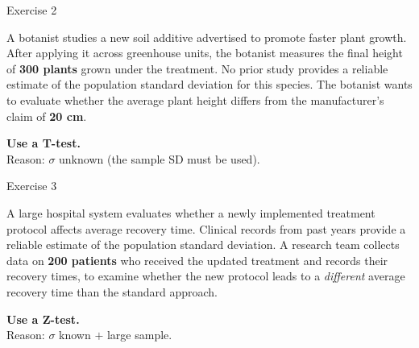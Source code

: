 \documentclass[aspectratio=169,11pt]{beamer}
\begin{document}
\begin{frame}{Exercise 2}
  \begin{keybox}[Scenario]
    A botanist studies a new soil additive advertised to promote faster plant
    growth. After applying it across greenhouse units, the botanist measures the
    final height of \textbf{300 plants} grown under the treatment. No prior study
    provides a reliable estimate of the population standard deviation for this
    species. The botanist wants to evaluate whether the average plant height
    differs from the manufacturer's claim of \textbf{20 cm}.
  \end{keybox}
  \vspace{0.5em}
  \begin{tcolorbox}[colback=qrlight,colframe=qrblue,arc=2pt,boxrule=0.6pt]
    \textbf{\color{qrnavy}Use a T-test.}\\
    Reason: $\sigma$ unknown (the sample SD must be used).
  \end{tcolorbox}
\end{frame}

\begin{frame}{Exercise 3}
  \begin{keybox}[Scenario]
    A large hospital system evaluates whether a newly implemented treatment
    protocol affects average recovery time. Clinical records from past years
    provide a reliable estimate of the population standard deviation. A research
    team collects data on \textbf{200 patients} who received the updated
    treatment and records their recovery times, to examine whether the new
    protocol leads to a \emph{different} average recovery time than the standard
    approach.
  \end{keybox}
  \vspace{0.4em}
  \begin{tcolorbox}[colback=qrlight,colframe=qrblue,arc=2pt,boxrule=0.6pt]
    \textbf{\color{qrnavy}Use a Z-test.}\\
    Reason: $\sigma$ known $+$ large sample.
  \end{tcolorbox}
\end{frame}
\end{document}
